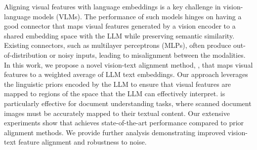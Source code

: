Aligning visual features with language embeddings is a key challenge in vision-language models (VLMs).  
The performance of such models hinges on having a good connector that maps visual features generated by a vision encoder to a shared embedding space with the LLM %
while preserving semantic similarity.
Existing connectors, such as multilayer perceptrons (MLPs), often produce out-of-distribution or noisy inputs, leading to misalignment between the modalities.
In this work, we propose a novel vision-text alignment method, \ourmodel{}, that maps visual features to a weighted average of LLM text embeddings. 
Our approach leverages the linguistic priors encoded by the LLM to ensure that visual features are mapped to regions of the space that the LLM can effectively interpret. 
\ourmodel{} is particularly effective for document understanding tasks, where scanned document images must be accurately mapped to their textual content.
Our extensive experiments show that \ourmodel{} achieves state-of-the-art performance compared to prior alignment methods. 
We provide further analysis demonstrating improved vision-text feature alignment and robustness to noise.

